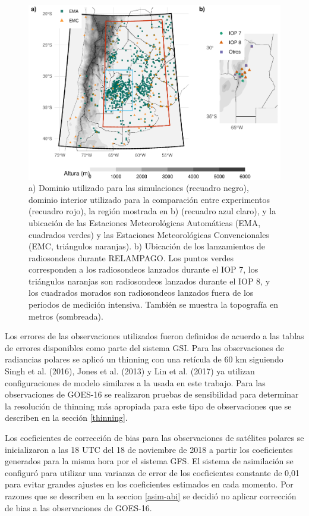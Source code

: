 \documentclass[12pt,oneside,a4paper]{reedthesis}
\begin{document}
\begin{figure}

{\centering \includegraphics[width=0.8\linewidth,]{thesis_files/figure-latex/dominio-1} 

}

\caption{a) Dominio utilizado para las simulaciones (recuadro negro), dominio interior utilizado para la comparación entre experimentos (recuadro rojo), la región mostrada en b) (recuadro azul claro), y la ubicación de las Estaciones Meteorológicas Automáticas (EMA, cuadrados verdes) y las Estaciones Meteorológicas Convencionales (EMC, triángulos naranjas). b) Ubicación de los lanzamientos de radiosondeos durante RELAMPAGO. Los puntos verdes corresponden a los radiosondeos lanzados durante el IOP 7, los triángulos naranjas son radiosondeos lanzados durante el IOP 8, y los cuadrados morados son radiosondeos lanzados fuera de los periodos de medición intensiva. También se muestra la topografía en metros (sombreada).}\label{fig:dominio}
\end{figure}
Los errores de las observaciones utilizados fueron definidos de acuerdo a las tablas de errores disponibles como parte del sistema GSI. Para las observaciones de radiancias polares se aplicó un thinning con una retícula de 60 km siguiendo Singh et al. (2016), Jones et al. (2013) y Lin et al. (2017) ya utilizan configuraciones de modelo similares a la usada en este trabajo. Para las observaciones de GOES-16 se realizaron pruebas de sensibilidad para determinar la resolución de thinning más apropiada para este tipo de observaciones que se describen en la sección \ref{thinning}.

Los coeficientes de corrección de bias para las observaciones de satélites polares se inicializaron a las 18 UTC del 18 de noviembre de 2018 a partir los coeficientes generados para la misma hora por el sistema GFS. El sistema de asimilación se configuró para utilizar una varianza de error de los coeficientes constante de 0,01 para evitar grandes ajustes en los coeficientes estimados en cada momento. Por razones que se describen en la seccion \ref{asim-abi} se decidió no aplicar corrección de bias a las observaciones de GOES-16.
\end{document}
